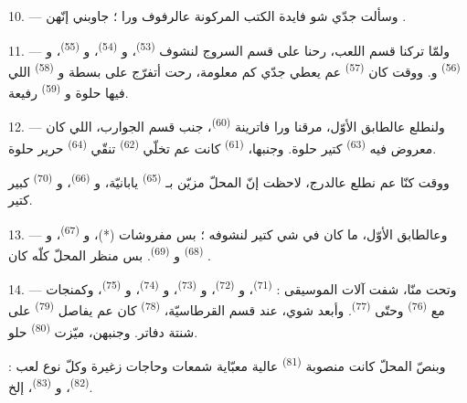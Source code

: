 10. --- وسألت جدّي شو فايدة الكتب المركونة عالرفوف ورا
 ؛ جاوبني إنّهن .

\VUsaut{3.6mm}
\VUsaut{2.8mm}

11. --- ولمّا تركنا قسم اللعب، رحنا على قسم السروج لنشوف
 \textsuperscript{(53)}، و
\textsuperscript{(54)}، و \textsuperscript{(55)}،
و \textsuperscript{(56)} و. ووقت كان
 \textsuperscript{(57)} عم يعطي جدّي كم معلومة، رحت
أتفرّج على بسطة  و
\textsuperscript{(58)} اللي فيها  حلوة
و \textsuperscript{(59)} رفيعة.

12. --- ولنطلع عالطابق الأوّل، مرقنا ورا فاترينة
 \textsuperscript{(60)}، جنب قسم الجوارب، اللي كان
معروض فيه  \textsuperscript{(63)} كتير حلوة. وجنبها،
 \textsuperscript{(61)} كانت عم تخلّي 
\textsuperscript{(62)} تنقّي  \textsuperscript{(64)} حرير
حلوة.

ووقت كنّا عم نطلع عالدرج، لاحظت إنّ المحلّ مزيّن
بـ \textsuperscript{(65)} يابانيّة، و
\textsuperscript{(66)}، و \textsuperscript{(70)} كبير كتير.

13. --- وعالطابق الأوّل، ما كان في شي كتير لنشوفه ؛ بس مفروشات (*)،
و \textsuperscript{(67)}، و
\textsuperscript{(68)} و \textsuperscript{(69)}. بس
منظر المحلّ كلّه كان .

14. --- وتحت منّا، شفت آلات الموسيقى : 
\textsuperscript{(71)}، و \textsuperscript{(72)}،
و \textsuperscript{(73)}، و
\textsuperscript{(74)}، و \textsuperscript{(75)}،
وكمنجات مع  \textsuperscript{(76)} وحتّى 
\textsuperscript{(77)}. وأبعد شوي، عند قسم القرطاسيّة، 
\textsuperscript{(78)} كان عم يفاصل  \textsuperscript{(79)}
على شنتة دفاتر. وجنبهن، ميّزت  \textsuperscript{(80)}
حلو.

وبنصّ المحلّ كانت منصوبة  \textsuperscript{(81)}
عالية معبّاية شمعات وحاجات زغيرة وكلّ نوع لعب : 
\textsuperscript{(82)}، و \textsuperscript{(83)}، إلخ.

